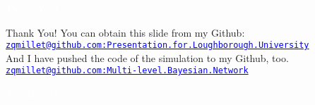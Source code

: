 






\begin{frame}{}
    \label{Section: Thank You}
    \centering
    \vfill\vspace{1em}\textcolor{white}{\scshape Thank You!}\vfill
\end{frame}


\begin{frame}{Thank You!}
    \label{Thank You: Thank You}
    You can obtain this slide from my Github:\\
    \href{https://github.com/zqmillet/Presentation.for.Loughborough.University}{\tt \small \textcolor{blue}{zqmillet@github.com:Presentation.for.Loughborough.University}}\\[15pt]

    \pause
    And I have pushed the code of the simulation to my Github, too.\\
    \href{https://github.com/zqmillet/Multi-level.Bayesian.Network}{\tt \small \textcolor{blue}{zqmillet@github.com:Multi-level.Bayesian.Network}}\\[15pt]

\end{frame}

\begin{frame}{}
    \label{Section: Questions}
    \centering
    \vfill\vspace{1em}\textcolor{white}{\scshape Any Questions?}\vfill
\end{frame}




